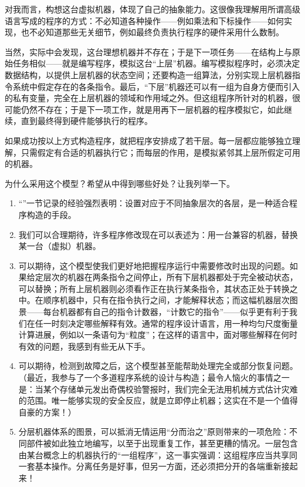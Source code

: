 对我而言，构想这台虚拟机器，体现了自己的抽象能力。这很像我理解用所谓高级语言写成的程序的方式：不必知道各种操作——例如乘法和下标操作——如何实现，也不必知道那些无关细节，例如最终负责执行程序的硬件采用什么数制。

当然，实际中会发现，这台理想机器并不存在；于是下一项任务——在结构上与原始任务相似——就是编写程序，模拟这台“上层”机器。编写模拟程序时，必须决定数据结构，以提供上层机器的状态空间；还要构造一组算法，分别实现上层机器指令系统中假定存在的各条指令。最后，“下层”机器还可以有一组为自身方便而引入的私有变量，完全在上层机器的领域和作用域之外。但这组程序所针对的机器，很可能仍然不存在；于是下一项工作，就是用再下一层机器的程序模拟它，如此继续，直到最终得到硬件能够执行的程序。

如果成功按以上方式构造程序，就把程序安排成了若干层。每一层都应能够独立理解，只需假定有合适的机器执行它；而每层的作用，是模拟紧邻其上层所假定可用的机器。

为什么采用这个模型？希望从中得到哪些好处？让我列举一下。

\begin{enumerate}[wide, nosep, label=(\arabic*)]
	\item “”一节记录的经验强烈表明：设置对应于不同抽象层次的各层，是一种适合程序构造的手段。

	\item 我们可以合理期待，许多程序修改现在可以表述为：用一台兼容的机器，替换某一台（虚拟）机器。

	\item 可以期待，这个模型使我们更好地把握程序运行中需要修改时出现的问题。如果给定层次的机器在两条指令之间停止，所有下层机器都处于完全被动状态，可以替换；所有上层机器则必须看作正在执行某条指令，其状态正处于转换之中。在顺序机器中，只有在指令执行之间，才能解释状态；而这幅机器层次图景——每台机器都有自己的指令计数器，“计数它的指令”——似乎更有利于我们在任一时刻决定哪些解释有效。通常的程序设计语言，用一种均匀尺度衡量计算进展，例如以一条语句为“粒度”；在这样的语言中，面对哪些解释在何时有效的问题，我感到有些无从下手。
	
	\item 可以期待，检测到故障之后，这个模型甚至能帮助处理完全或部分恢复问题。（最近，我参与了一个多道程序系统的设计与构造；最令人恼火的事情之一是：当某个存储单元发出奇偶校验警报时，我们完全无法用机械方式估计灾难的范围。唯一能够实现的安全反应，就是立即停止机器；这实在不是一个值得自豪的方案！）
	
	\item 分层机器体系的图景，可以抵消无情运用“分而治之”原则带来的一项危险：不同部件被如此独立地编写，以至于出现重复工作，甚至更糟的情况。一层包含由某台概念上的机器执行的“一组程序”，这一事实强调：这组程序应当共享同一套基本操作。分离任务是好事，但另一方面，还必须把分开的各端重新接起来！
\end{enumerate}

